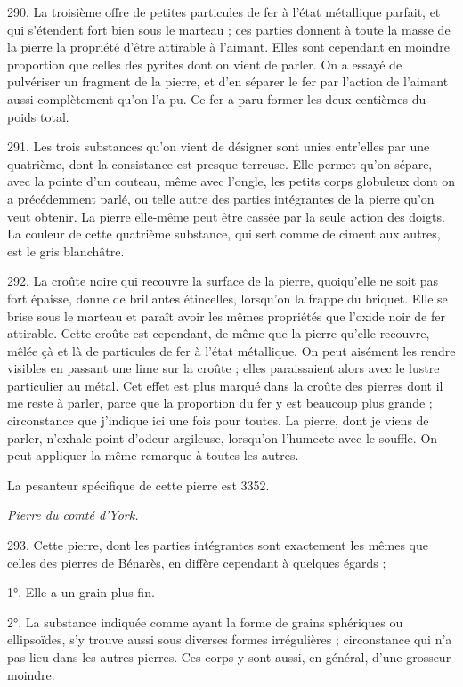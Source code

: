 \documentclass[a4paper, 11pt, oneside, polutonikogreek, french]{article}
\begin{document}
290. La troisième offre de petites particules de fer à l'état métallique parfait, et qui s'étendent fort bien sous le marteau ; ces parties donnent à toute la masse de la pierre la propriété d'être attirable à l'aimant. Elles sont cependant en moindre proportion que celles des pyrites dont on vient de parler. On a essayé de pulvériser un fragment de la pierre, et d'en séparer le fer par l'action de l'aimant aussi complètement qu'on l'a pu. Ce fer a paru former les deux centièmes du poids total.

291. Les trois substances qu'on vient de désigner sont unies entr'elles par une quatrième, dont la consistance est presque terreuse. Elle permet qu'on sépare, avec la pointe d'un couteau, même avec l'ongle, les petits corps globuleux dont on a précédemment parlé, ou telle autre des parties intégrantes de la pierre qu'on veut obtenir. La pierre elle-même peut être cassée par la seule action des doigts. La couleur de cette quatrième substance, qui sert comme de ciment aux autres, est le gris blanchâtre.

292. La croûte noire qui recouvre la surface de la pierre, quoiqu'elle ne soit pas fort épaisse, donne de brillantes étincelles, lorsqu'on la frappe du briquet. Elle se brise sous le marteau et paraît avoir les mêmes propriétés que l'oxide noir de fer attirable. Cette croûte est cependant, de même que la pierre qu'elle recouvre, mêlée çà et là de particules de fer à l'état métallique. On peut aisément les rendre visibles en passant une lime sur la croûte ; elles paraissaient alors avec le lustre particulier au métal. Cet effet est plus marqué dans la croûte des pierres dont il me reste à parler, parce que la proportion du fer y est beaucoup plus grande ; circonstance que j'indique ici une fois pour toutes. La pierre, dont je viens de parler, n'exhale point d'odeur argileuse, lorsqu'on l'humecte avec le souffle. On peut appliquer la même remarque à toutes les autres.

La pesanteur spécifique de cette pierre est 3352.

\begin{center}
\emph{Pierre du comté d'York.}
\end{center}

293. Cette pierre, dont les parties intégrantes sont exactement les mêmes que celles des pierres de Bénarès, en diffère cependant à quelques égards ;

1°. Elle a un grain plus fin.

2°. La substance indiquée comme ayant la forme de grains sphériques ou ellipsoïdes, s'y trouve aussi sous diverses formes irrégulières ; circonstance qui n'a pas lieu dans les autres pierres. Ces corps y sont aussi, en général, d'une grosseur moindre.
\end{document}
